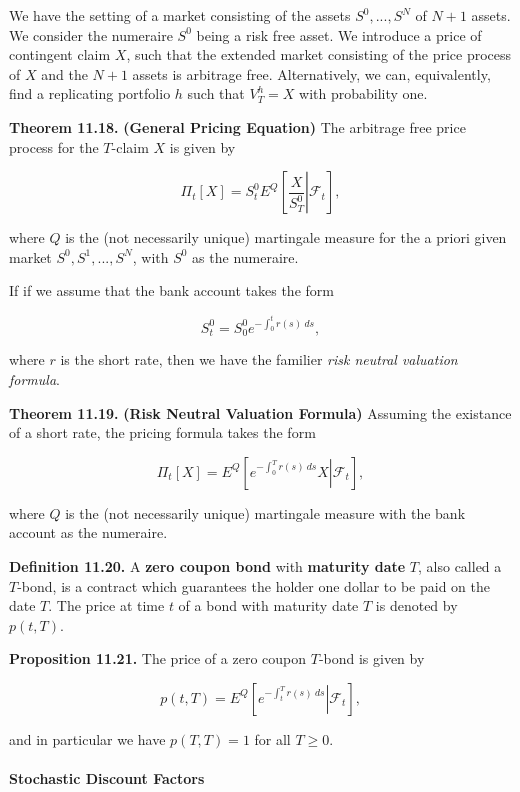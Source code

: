 \documentclass[
]{article}
\begin{document}
We have the setting of a market consisting of the assets \(S^0,...,S^N\)
of \(N+1\) assets. We consider the numeraire \(S^0\) being a risk free
asset. We introduce a price of contingent claim \(X\), such that the
extended market consisting of the price process of \(X\) and the \(N+1\)
assets is arbitrage free. Alternatively, we can, equivalently, find a
replicating portfolio \(h\) such that \(V^h_T=X\) with probability one.

\textbf{Theorem 11.18.} \textbf{(General Pricing Equation)} The
arbitrage free price process for the \(T\)-claim \(X\) is given by

\[
\Pi_t[X]=S_t^0E^Q\left[\left.\frac{X}{S^0_T}\right\vert \mathcal{F}_t\right],
\]

where \(Q\) is the (not necessarily unique) martingale measure for the a
priori given market \(S^0,S^1,...,S^N\), with \(S^0\) as the numeraire.

If if we assume that the bank account takes the form

\[
S_t^0=S_0^0e^{-\int_0^tr(s)\ ds},
\]

where \(r\) is the short rate, then we have the familier \emph{risk
neutral valuation formula}.

\textbf{Theorem 11.19.} \textbf{(Risk Neutral Valuation Formula)}
Assuming the existance of a short rate, the pricing formula takes the
form

\[
\Pi_t[X]=E^Q\left[\left.e^{-\int_0^Tr(s)\ ds}X\right\vert \mathcal{F}_t\right],
\]

where \(Q\) is the (not necessarily unique) martingale measure with the
bank account as the numeraire.

\textbf{Definition 11.20.} A \textbf{zero coupon bond} with
\textbf{maturity date} \(T\), also called a \(T\)-bond, is a contract
which guarantees the holder one dollar to be paid on the date \(T\). The
price at time \(t\) of a bond with maturity date \(T\) is denoted by
\(p(t,T)\).

\textbf{Proposition 11.21.} The price of a zero coupon \(T\)-bond is
given by

\[
p(t,T)=E^Q\left[\left.e^{-\int_t^Tr(s)\ ds}\right\vert \mathcal{F}_t\right],
\]

and in particular we have \(p(T,T)=1\) for all \(T\ge 0\).

\hypertarget{stochastic-discount-factors-1}{%
\paragraph{Stochastic Discount
Factors}\label{stochastic-discount-factors-1}}
\end{document}
